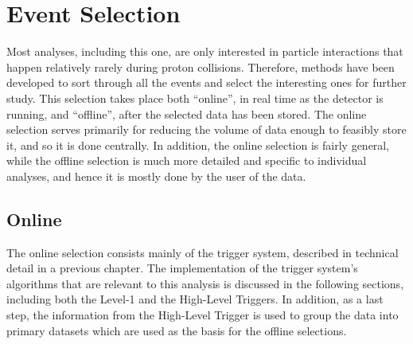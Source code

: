 \chapter{Event Selection}
Most analyses, including this one, are only interested in particle 
interactions that happen relatively rarely during proton collisions.  
Therefore, methods have been developed to sort through all the 
events and select the interesting ones for further study.  
This selection takes place both ``online'', in real time as the 
detector is running, and ``offline'', after the selected data has 
been stored.  
The online selection serves primarily for reducing the 
volume of data enough to feasibly store it, and so it is done centrally. 
In addition, the online selection is fairly general, 
while the offline selection is much more detailed and specific to individual 
analyses, and hence it is mostly done by the user of the data.  


\section{Online}
The online selection consists mainly of the trigger system, 
described in technical detail in a previous chapter.  
The implementation of the trigger system's algorithms 
that are relevant to this analysis 
is discussed in the following sections, 
including both the Level-1 and the High-Level Triggers.  
In addition, as a last step, the information 
from the High-Level Trigger is used to 
group the data into primary datasets
which are used as the basis for the offline selections.  

